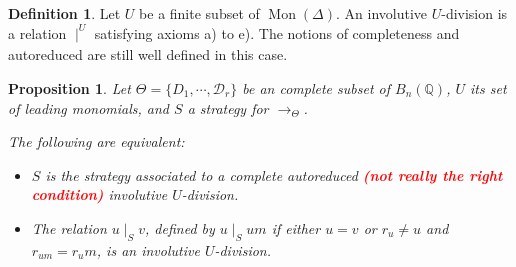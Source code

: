 \documentclass[10pt]{easychair}
\newtheorem{proposition}[theorem]{Proposition}
\theoremstyle{definition}
\newtheorem{definition}[theorem]{Definition}
\newcommand\todo[1]{{\bf\textcolor{red}{#1}}}
\newcommand\D{\mathcal{D}}
\newcommand\Q{\mathbb{Q}}
\newcommand\Weyl[1]{B_{#1}(\Q)}
\DeclareMathOperator{\Mon}{Mon}
\newcommand\rewTheta{\to_{\Theta}}
\newcommand\divInv[1]{\mid_{#1}}
\begin{document}
\begin{definition}
  Let $U$ be a finite subset of $\Mon(\Delta)$. An involutive $U$-division is a
  relation $\divInv{}^U$ satisfying axioms a) to e). The notions of completeness
  and autoreduced are still well defined in this case.
\end{definition}

\begin{proposition}
  Let $\Theta=\{D_1,\cdots,\D_r\}$ be an complete subset of $\Weyl{n}$, $U$ its set of
  leading monomials, and $S$ a strategy for $\rewTheta$.
  
  The following are equivalent:
  \begin{itemize}
  \item $S$ is the strategy associated to a complete autoreduced \todo{(not
      really the right condition)} involutive $U$-division.
  \item The relation $u \divInv{S} v$, defined by $u \divInv{S} um$ if either
    $u = v$ or $r_u \neq u$ and $r_{um} = r_u m$, is an involutive $U$-division.
  \end{itemize}
\end{proposition}
\end{document}
